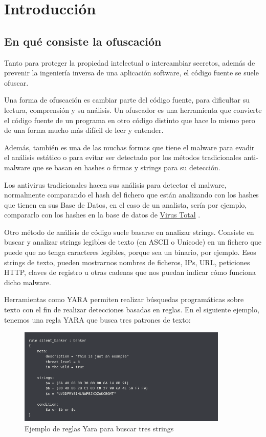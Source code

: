 \documentclass[15pt]{article}
\begin{document}
	\newpage
	\tableofcontents
	\newpage
	
	\section{Introducción}
	\subsection{En qué consiste la ofuscación}
	Tanto para proteger la propiedad intelectual o intercambiar secretos, además de prevenir la ingeniería inversa de una aplicación software, el código fuente se suele ofuscar.
	
	Una forma de ofuscación es cambiar parte del código fuente, para dificultar su lectura, comprensión y su análisis. Un ofuscador es una herramienta que convierte el código fuente de un programa en otro código distinto que hace lo mismo pero de una forma mucho más difícil de leer y entender.
	
	Además, también es una de las muchas formas que tiene el malware para evadir el análisis estático o para evitar ser detectado por los métodos tradicionales anti-malware que se basan en hashes o firmas y strings para su detección.
	
	Los antivirus tradicionales hacen sus análisis para detectar el malware, normalmente comparando el hash del fichero que están analizando con los hashes que tienen en sus Base de Datos, en el caso de un analista, sería por ejemplo, compararlo con los hashes en la base de datos de \href{https://www.virustotal.com/gui/}{Virus Total} \cite{virustotal}. 
	
	Otro método de análisis de código suele basarse en analizar strings. Consiste en buscar y analizar strings legibles de texto (en ASCII o Unicode) en un fichero que puede que no tenga caracteres legibles, porque sea un binario, por ejemplo. Esos strings de texto, pueden mostrarnos nombres de ficheros, IPs, URL, peticiones HTTP, claves de registro u otras cadenas que nos puedan indicar cómo funciona dicho malware. 
	
	Herramientas como YARA permiten realizar búsquedas programáticas sobre texto con el fin de realizar detecciones basadas en reglas. En el siguiente ejemplo, tenemos una regla YARA que busca tres patrones de texto:\cite{yara}
	
	\begin{figure}[h]
		\centering
		\includegraphics[width=10cm]{images/yara.png}
		\caption{Ejemplo de reglas Yara para buscar tres strings}
	\end{figure}
	
\end{document}
